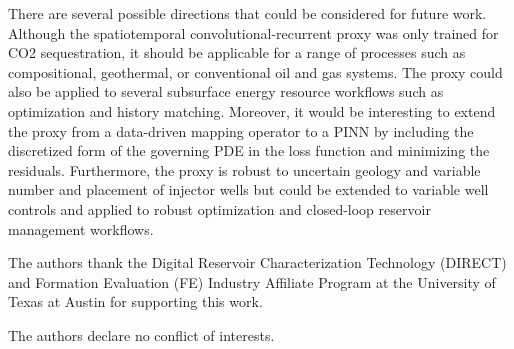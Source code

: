 \documentclass[default,iicol,lineno]{sn-jnl}%
\begin{document}
There are several possible directions that could be considered for future work. Although the spatiotemporal convolutional-recurrent proxy was only trained for CO2 sequestration, it should be applicable for a range of processes such as compositional, geothermal, or conventional oil and gas systems. The proxy could also be applied to several subsurface energy resource workflows such as optimization and history matching. Moreover, it would be interesting to extend the proxy from a data-driven mapping operator to a PINN by including the discretized form of the governing PDE in the loss function and minimizing the residuals. Furthermore, the proxy is robust to uncertain geology and variable number and placement of injector wells but could be extended to variable well controls and applied to robust optimization and closed-loop reservoir management workflows. 

\backmatter

The authors thank the Digital Reservoir Characterization Technology (DIRECT) and Formation Evaluation (FE) Industry Affiliate Program at the University of Texas at Austin for supporting this work.

The authors declare no conflict of interests.



\end{document}
